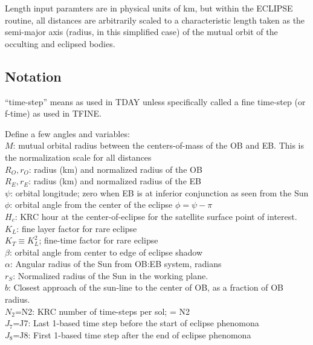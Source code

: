\documentclass{article}
\begin{document}
Length input paramters are in physical units of km, but within the ECLIPSE
routine, all distances are arbitrarily scaled to a characteristic length taken
as the semi-major axis (radius, in this simplified case) of the mutual orbit of
the occulting and eclipsed bodies.

\subsection{Notation}
``time-step'' means as used in TDAY unless specifically called a fine time-step (or f-time) as used in TFINE.


Define a few angles and variables:
\\ $M$: mutual orbital radius between the centers-of-mass of the OB and EB. 
\qi This is the normalization scale for all distances
\\ $R_O, r_O$: radius (km) and normalized radius of the OB 
\\ $R_E, r_E $: radius (km) and normalized radius of the EB
\\ $\psi$: orbital longitude; zero when EB is at inferior conjunction as seen from the Sun 
\\ $\phi$: orbital angle from the center of the eclipse $\phi=\psi -\pi$
\\ $H_c$: KRC hour at the center-of-eclipse for the satellite surface point of interest.
\\ $K_L$: fine layer factor for rare eclipse
\\ $K_T \equiv K_L^2$; fine-time factor for rare eclipse
\\ $\beta$: orbital angle from center to edge of eclipse shadow
\\ $ \alpha $: Angular radius of the Sun from OB:EB system, radians 
\\ $r_S$: Normalized radius of the Sun in the working plane.
\\ $ b$: Closest approach of the sun-line to the center of OB, as a fraction of OB radius.
\\ $N_2$=N2: KRC number of time-steps per sol; = N2
\\ $J_7 $=J7: Last 1-based time step before the start of eclipse phenomona
\\ $J_8$=J8: First 1-based time step after the end of eclipse phenomona
\end{document}

